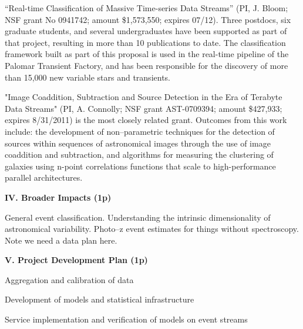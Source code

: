 ``Real-time Classification of Massive Time-series Data Streams'' (PI, J. Bloom;
NSF grant No 0941742; amount \$1,573,550; expires 07/12).  Three postdocs, six
graduate students, and several undergraduates have been supported as part of
that project, resulting in more than 10 publications to date.  The
classification framework built as part of this proposal is used in the real-time
pipeline of the Palomar Transient Factory, and has been responsible for the
discovery of more than 15,000 new variable stars and transients.

 \smallskip

"Image Coaddition, Subtraction and Source Detection in the Era of Terabyte Data
Streams" (PI, A. Connolly; NSF grant AST-0709394; amount \$427,933; expires
8/31/2011) is the most closely related grant.  Outcomes from this work include:
the development of non--parametric techniques for the detection of sources
within sequences of astronomical images through the use of image coaddition and
subtraction, and algorithms for measuring the clustering of galaxies using
n-point correlations functions that scale to high-performance parallel
architectures.

\bigskip \centerline{\bf IV. Broader Impacts (1p)} \smallskip {}

General event classification.  Understanding the intrinsic dimensionality of
astronomical variability. Photo--z event estimates for things without
spectroscopy.  Note we need a data plan here.

\bigskip \centerline{\bf V. Project Development Plan (1p)} \smallskip

 \smallskip

Aggregation and calibration of data

 \smallskip

Development of models and statistical infrastructure

 \smallskip

Service implementation and verification of models on event streams

